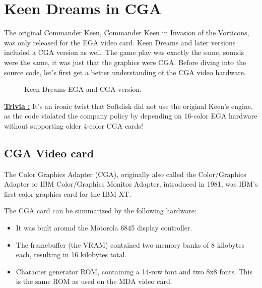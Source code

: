 \documentclass[book.tex]{subfiles}
\begin{document}
\section{Keen Dreams in CGA}
The original Commander Keen, Commander Keen in Invasion of the Vorticons, was only released for the EGA video card. Keen Dreams and later versions included a CGA version as well. The game play was exactly the same, sounds were the same, it was just that the graphics were CGA. Before diving into  the source code, let's first get a better understanding of the CGA video hardware.\\


\begin{figure}[H] 
  \centering 
  \caption{Keen Dreams EGA and CGA version.}
\end{figure}

\bigskip
\par
\textbf{\underline{Trivia :}} It's an ironic twist that Softdisk did not use the original Keen's engine, as the code violated the company policy by depending on 16-color EGA hardware without supporting older 4-color CGA cards!\\
\par


 

\subsection{CGA Video card}
The Color Graphics Adapter (CGA), originally also called the Color/Graphics Adapter or IBM Color/Graphics Monitor Adapter, introduced in 1981, was IBM's first color graphics card for the IBM XT.\\
\par
The CGA card can be summarized by the following hardware:
\begin{itemize}
  \item It was built around the Motorola 6845 display controller.
  \item The framebuffer (the VRAM) contained two memory banks of 8 kilobytes each, resulting in 16 kilobytes total.
  \item Character generator ROM, containing a 14-row font and two 8x8 fonts. This is the same ROM as used on the MDA video card.
\end{itemize}
\end{document}
